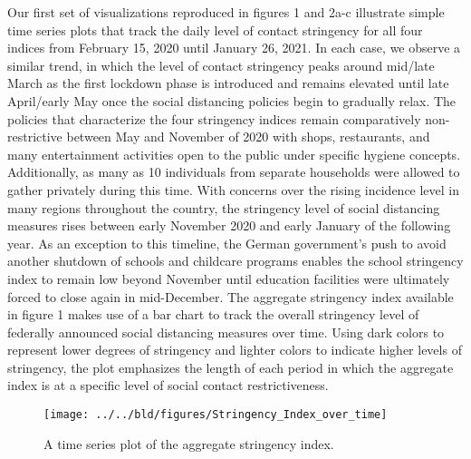 Our first set of visualizations reproduced in figures 1 and 2a-c illustrate simple time series plots that track the daily level of contact stringency for all four indices from February 15, 2020 until January 26, 2021. In each case, we observe a similar trend, in which the level of contact stringency peaks around mid/late March as the first lockdown phase is introduced and remains elevated until late April/early May once the social distancing policies begin to gradually relax. The policies that characterize the four stringency indices remain comparatively non-restrictive between May and November of 2020 with shops, restaurants, and many entertainment activities open to the public under specific hygiene concepts. Additionally, as many as 10 individuals from separate households were allowed to gather privately during this time. With concerns over the rising incidence level in many regions throughout the country, the stringency level of social distancing measures rises between early November 2020 and early January of the following year. As an exception to this timeline, the German government’s push to avoid another shutdown of schools and childcare programs enables the school stringency index to remain low beyond November until education facilities were ultimately forced to close again in mid-December. The aggregate stringency index available in figure 1 makes use of a bar chart to track the overall stringency level of federally announced social distancing measures over time. Using dark colors to represent lower degrees of stringency and lighter colors to indicate higher levels of stringency, the plot emphasizes the length of each period in which the aggregate index is at a specific level of social contact restrictiveness.

\begin{figure}[H]
      \centering
      \texttt{[image: ../../bld/figures/Stringency\_Index\_over\_time]}
      \label{fig:five over x}
      \caption{A time series plot of the aggregate stringency index.}
      \label{fig:aggindex}
\end{figure}

